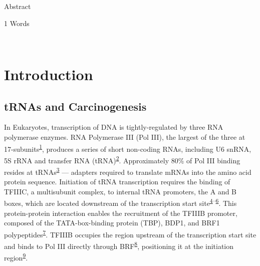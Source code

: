 \documentclass[
  11pt,
]{article}
\begin{document}
Abstract

\normalsize
\begin{flushright}
1 Words
\end{flushright}
\hrulefill\\
\setlength{\parindent}{10pt}

\hypertarget{introduction}{%
\section{Introduction}\label{introduction}}

\hypertarget{trnas-and-carcinogenesis}{%
\subsection{tRNAs and Carcinogenesis}\label{trnas-and-carcinogenesis}}

In Eukaryotes, transcription of DNA is tightly-regulated by three RNA polymerase enzymes.
RNA Polymerase III (Pol III), the largest of the three at 17-subunits\textsuperscript{\protect\hyperlink{ref-vannini2012}{1}}, produces a series of short non-coding RNAs, including U6 snRNA, 5S rRNA and transfer RNA (tRNA)\textsuperscript{\protect\hyperlink{ref-dieci2007}{2}}.
Approximately 80\% of Pol III binding resides at tRNAs\textsuperscript{\protect\hyperlink{ref-Raha2010a}{3}} --- adapters required to translate mRNAs into the amino acid protein sequence.
Initiation of tRNA transcription requires the binding of TFIIIC, a multisubunit complex, to internal tRNA promoters, the A and B boxes, which are located downstream of the transcription start site\textsuperscript{\protect\hyperlink{ref-Schramm2002}{4}--\protect\hyperlink{ref-Galli1981}{6}}.
This protein-protein interaction enables the recruitment of the TFIIIB promoter, composed of the TATA-box-binding protein (TBP), BDP1, and BRF1 polypeptides\textsuperscript{\protect\hyperlink{ref-schramm2000}{7}}.
TFIIIB occupies the region upstream of the transcription start site and binds to Pol III directly through BRF\textsuperscript{\protect\hyperlink{ref-Khoo1994}{8}}, positioning it at the initiation region\textsuperscript{\protect\hyperlink{ref-kassavetis1990}{9}}.
\end{document}
